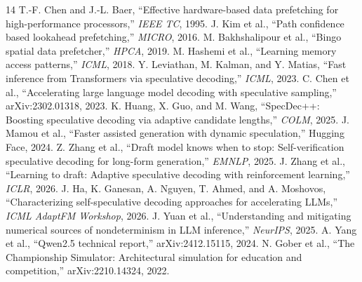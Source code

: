 \documentclass[conference]{IEEEtran}
\begin{document}
\begin{thebibliography}{14}
 T.-F. Chen and J.-L. Baer, ``Effective hardware-based data
prefetching for high-performance processors,'' \emph{IEEE TC}, 1995.
 J. Kim et al., ``Path confidence based lookahead prefetching,''
\emph{MICRO}, 2016.
 M. Bakhshalipour et al., ``Bingo spatial data prefetcher,''
\emph{HPCA}, 2019.
 M. Hashemi et al., ``Learning memory access patterns,''
\emph{ICML}, 2018.
 Y. Leviathan, M. Kalman, and Y. Matias, ``Fast inference
from Transformers via speculative decoding,'' \emph{ICML}, 2023.
 C. Chen et al., ``Accelerating large language model decoding
with speculative sampling,'' arXiv:2302.01318, 2023.
 K. Huang, X. Guo, and M. Wang, ``SpecDec++: Boosting
speculative decoding via adaptive candidate lengths,'' \emph{COLM}, 2025.
 J. Mamou et al., ``Faster assisted generation with dynamic
speculation,'' Hugging Face, 2024.
 Z. Zhang et al., ``Draft model knows when to stop:
Self-verification speculative decoding for long-form generation,''
\emph{EMNLP}, 2025.
 J. Zhang et al., ``Learning to draft: Adaptive speculative
decoding with reinforcement learning,'' \emph{ICLR}, 2026.
 J. Ha, K. Ganesan, A. Nguyen, T. Ahmed, and A. Moshovos,
``Characterizing self-speculative decoding approaches for accelerating
LLMs,'' \emph{ICML AdaptFM Workshop}, 2026.
 J. Yuan et al., ``Understanding and mitigating numerical
sources of nondeterminism in LLM inference,'' \emph{NeurIPS}, 2025.
 A. Yang et al., ``Qwen2.5 technical report,''
arXiv:2412.15115, 2024.
 N. Gober et al., ``The Championship Simulator:
Architectural simulation for education and competition,'' arXiv:2210.14324,
2022.
\end{thebibliography}
\end{document}
